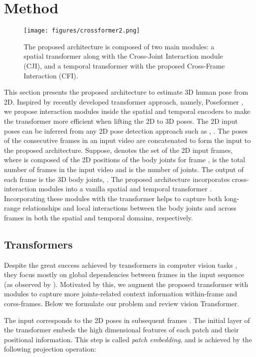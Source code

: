 \documentclass[runningheads]{llncs}
\begin{document}
\section{Method}
\begin{figure}[t]
    \centering
    \texttt{[image: figures/crossformer2.png]}
    \caption{The proposed architecture is composed of two main modules: a spatial transformer along with the Cross-Joint Interaction module (CJI), and a temporal transformer with the proposed Cross-Frame Interaction (CFI).}
    \label{fig:method}
\vspace{-1em}
\end{figure}
This section presents the proposed architecture to estimate 3D human pose from 2D. Inspired by recently developed transformer approach, namely, Poseformer \cite{poseformer}, we propose interaction modules inside the spatial and temporal encoders to make the transformer more efficient when lifting the 2D to 3D poses. The 2D input poses can be inferred from any 2D pose detection approach such as \cite{chen2018cascaded}, \cite{he2017mask}. The poses of the consecutive frames in an input video are concatenated to form the input to the proposed architecture. Suppose,  denotes the set of the 2D input frames, where  is composed of the 2D positions of the body joints for frame ,  is the total number of frames in the input video and  is the number of joints. The output of each frame is the 3D body joints, . The proposed architecture incorporates cross-interaction modules into a vanilla spatial and temporal transformer \cite{dosovitskiy2020image}. Incorporating these modules with the transformer helps to capture both long-range relationships and local interactions between the body joints and across frames in both the spatial and temporal domains, respectively.

\subsection{Transformers}
Despite the great success achieved by transformers in computer vision tasks \cite{dosovitskiy2020image}, they focus mostly on global dependencies between frames in the input sequence (as observed by \cite{poseformer}). Motivated by this, we augment the proposed transformer with modules to capture more joints-related context information  within-frame  and corss-frames. Below we formulate our problem and review vision Transformer.


The input corresponds to the 2D poses in subsequent frames . The initial layer of the transformer embeds the high dimensional features of each patch and their positional information. This step is called \textit{patch embedding}, and is achieved by the following projection operation:
\end{document}
